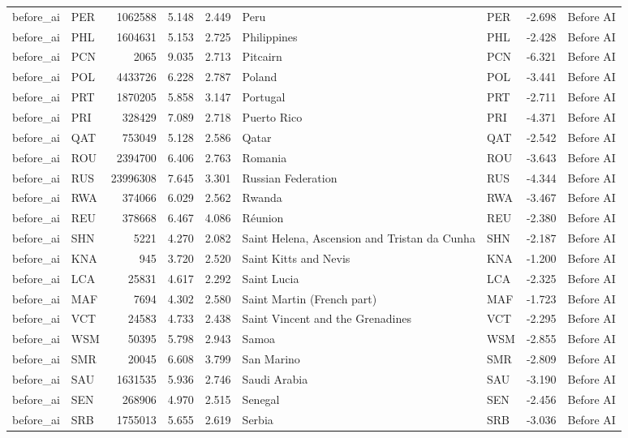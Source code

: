 \begin{tabular}{llrrrllrl}
before\_ai & PER & 1062588 & 5.148 & 2.449 & Peru & PER & -2.698 & Before AI \\
before\_ai & PHL & 1604631 & 5.153 & 2.725 & Philippines & PHL & -2.428 & Before AI \\
before\_ai & PCN & 2065 & 9.035 & 2.713 & Pitcairn & PCN & -6.321 & Before AI \\
before\_ai & POL & 4433726 & 6.228 & 2.787 & Poland & POL & -3.441 & Before AI \\
before\_ai & PRT & 1870205 & 5.858 & 3.147 & Portugal & PRT & -2.711 & Before AI \\
before\_ai & PRI & 328429 & 7.089 & 2.718 & Puerto Rico & PRI & -4.371 & Before AI \\
before\_ai & QAT & 753049 & 5.128 & 2.586 & Qatar & QAT & -2.542 & Before AI \\
before\_ai & ROU & 2394700 & 6.406 & 2.763 & Romania & ROU & -3.643 & Before AI \\
before\_ai & RUS & 23996308 & 7.645 & 3.301 & Russian Federation & RUS & -4.344 & Before AI \\
before\_ai & RWA & 374066 & 6.029 & 2.562 & Rwanda & RWA & -3.467 & Before AI \\
before\_ai & REU & 378668 & 6.467 & 4.086 & Réunion & REU & -2.380 & Before AI \\
before\_ai & SHN & 5221 & 4.270 & 2.082 & Saint Helena, Ascension and Tristan da Cunha & SHN & -2.187 & Before AI \\
before\_ai & KNA & 945 & 3.720 & 2.520 & Saint Kitts and Nevis & KNA & -1.200 & Before AI \\
before\_ai & LCA & 25831 & 4.617 & 2.292 & Saint Lucia & LCA & -2.325 & Before AI \\
before\_ai & MAF & 7694 & 4.302 & 2.580 & Saint Martin (French part) & MAF & -1.723 & Before AI \\
before\_ai & VCT & 24583 & 4.733 & 2.438 & Saint Vincent and the Grenadines & VCT & -2.295 & Before AI \\
before\_ai & WSM & 50395 & 5.798 & 2.943 & Samoa & WSM & -2.855 & Before AI \\
before\_ai & SMR & 20045 & 6.608 & 3.799 & San Marino & SMR & -2.809 & Before AI \\
before\_ai & SAU & 1631535 & 5.936 & 2.746 & Saudi Arabia & SAU & -3.190 & Before AI \\
before\_ai & SEN & 268906 & 4.970 & 2.515 & Senegal & SEN & -2.456 & Before AI \\
before\_ai & SRB & 1755013 & 5.655 & 2.619 & Serbia & SRB & -3.036 & Before AI \\

\end{tabular}
